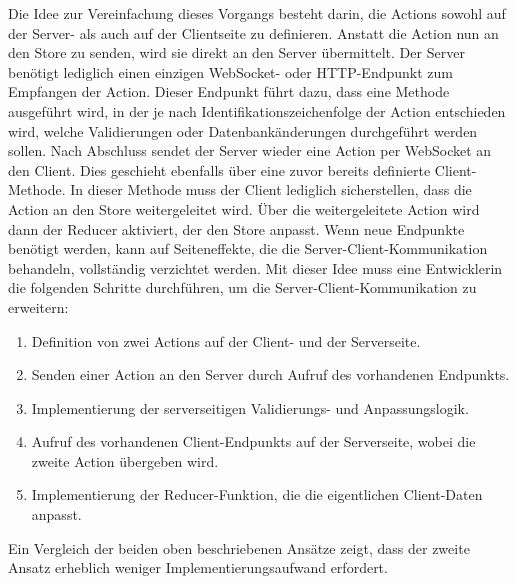 \documentclass[12pt]{article} %
\begin{document}
Die Idee zur Vereinfachung dieses Vorgangs besteht darin, die Actions sowohl auf der Server- als auch auf der Clientseite zu definieren. Anstatt die Action nun an den Store zu senden, wird sie direkt an den Server übermittelt. Der Server benötigt lediglich einen einzigen WebSocket- oder HTTP-Endpunkt zum Empfangen der Action. Dieser Endpunkt führt dazu, dass eine Methode ausgeführt wird, in der je nach Identifikationszeichenfolge der Action entschieden wird, welche Validierungen oder Datenbankänderungen durchgeführt werden sollen. Nach Abschluss sendet der Server wieder eine Action per WebSocket an den Client. Dies geschieht ebenfalls über eine zuvor bereits definierte Client-Methode. In dieser Methode muss der Client lediglich sicherstellen, dass die Action an den Store weitergeleitet wird. Über die weitergeleitete Action wird dann der Reducer aktiviert, der den Store anpasst. Wenn neue Endpunkte benötigt werden, kann auf Seiteneffekte, die die Server-Client-Kommunikation behandeln, vollständig verzichtet werden. Mit dieser Idee muss eine Entwicklerin die folgenden Schritte durchführen, um die Server-Client-Kommunikation zu erweitern:
\begin{enumerate}
    \item Definition von zwei Actions auf der Client- und der Serverseite.
    \item Senden einer Action an den Server durch Aufruf des vorhandenen Endpunkts.
    \item Implementierung der serverseitigen Validierungs- und Anpassungslogik.
    \item Aufruf des vorhandenen Client-Endpunkts auf der Serverseite, wobei die zweite Action übergeben wird.
    \item Implementierung der Reducer-Funktion, die die eigentlichen Client-Daten anpasst.
\end{enumerate}

Ein Vergleich der beiden oben beschriebenen Ansätze zeigt, dass der zweite Ansatz erheblich weniger Implementierungsaufwand erfordert.
\\
\end{document}
